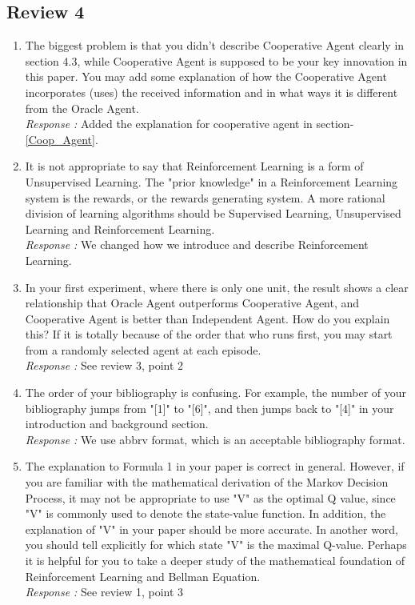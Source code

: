 \subsection{Review 4}
\begin{enumerate}
\item The biggest problem is that you didn't describe Cooperative Agent clearly in section 4.3, while Cooperative Agent is supposed to be your key innovation in this paper. You may add some explanation of how the Cooperative Agent incorporates (uses) the received information and in what ways it is different from the Oracle Agent.\\
{\it Response : }Added the explanation for cooperative agent in section-\ref{Coop_Agent}.

\item It is not appropriate to say that Reinforcement Learning is a form of Unsupervised Learning. The "prior knowledge" in a Reinforcement Learning system is the rewards, or the rewards generating system. A more rational division of  learning algorithms should be Supervised Learning, Unsupervised Learning and Reinforcement Learning.\\
{\it Response : }We changed how we introduce and describe Reinforcement Learning.

\item In your first experiment, where there is only one unit, the result shows a clear relationship that Oracle Agent outperforms Cooperative Agent, and Cooperative Agent is better than Independent Agent. How do you explain this? If it is totally because of the order that who runs first, you may start from a randomly selected agent at each episode.\\
{\it Response : }See review 3, point 2

\item The order of your bibliography is confusing. For example, the number of your bibliography jumps from "[1]" to "[6]", and then jumps back to "[4]" in your introduction and background section.\\
{\it Response : }We use abbrv format, which is an acceptable bibliography format.

\item The explanation to Formula 1 in your paper is correct in general. However, if you are familiar with the mathematical derivation of  the Markov Decision Process, it may not be appropriate to use "V" as the  optimal Q value, since "V" is commonly used to denote the state-value function. In addition, the explanation of "V" in your paper should be more accurate. In another word, you should tell explicitly for which state "V" is the maximal Q-value. Perhaps it is helpful for you to take a deeper study of the mathematical foundation of Reinforcement Learning and Bellman Equation.\\
{\it Response : }See review 1, point 3


\end{enumerate}
